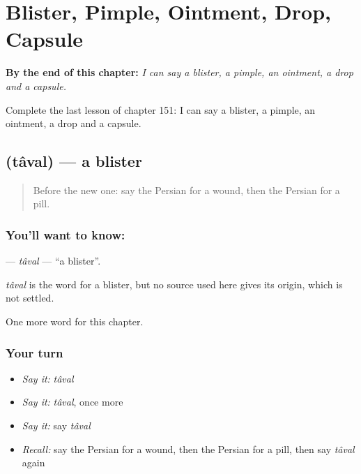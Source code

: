
\chapter{Blister, Pimple, Ointment, Drop, Capsule}
\label{ch:fa-blister-pimple-ointment-drop-capsule}

\begin{chapteropening}
\textbf{By the end of this chapter:} \emph{I can say a blister, a pimple, an ointment, a drop and a capsule.}

Complete the last lesson of chapter 151: I can say a blister, a pimple, an ointment, a drop and a capsule.
\end{chapteropening}

\section[\texorpdfstring{\fa{تاول} (tâval)}{تاول (tâval)}]{ (tâval) — a blister}

\label{lesson:FA-C151-taval}



\begin{quote}
Before the new one: say the Persian for a wound, then the Persian for a pill.
\end{quote}

\subsection*{You'll want to know: }
\textbf{} — \emph{tâval} — \textquotedblleft{}a blister\textquotedblright{}.

\begin{cousinweb}
\emph{tâval} is the word for a blister, but no source used here gives its origin, which is not settled.
\end{cousinweb}

\begin{grammarlens}[title={What you've built}]
One more word for this chapter.
\end{grammarlens}

\subsection*{Your turn}
\begin{itemize}
\raggedright
  \item \emph{Say it:} \emph{tâval}
  \item \emph{Say it:} \emph{tâval}, once more
  \item \emph{Say it:} say \emph{tâval}
  \item \emph{Recall:} say the Persian for a wound, then the Persian for a pill, then say \emph{tâval} again
\end{itemize}

